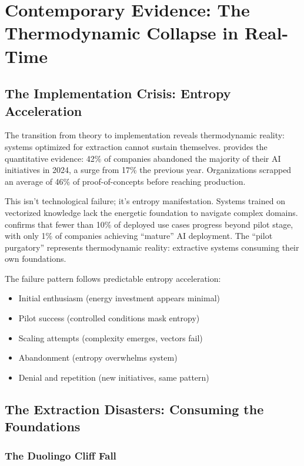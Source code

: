 \section{Contemporary Evidence: The Thermodynamic Collapse in Real-Time}

\subsection{The Implementation Crisis: Entropy Acceleration}

The transition from theory to implementation reveals thermodynamic reality: systems optimized for extraction cannot sustain themselves. \citet{spglobal2025} provides the quantitative evidence: 42\% of companies abandoned the majority of their AI initiatives in 2024, a surge from 17\% the previous year. Organizations scrapped an average of 46\% of proof-of-concepts before reaching production.

This isn't technological failure; it's entropy manifestation. Systems trained on vectorized knowledge lack the energetic foundation to navigate complex domains. \citet{mckinsey2025} confirms that fewer than 10\% of deployed use cases progress beyond pilot stage, with only 1\% of companies achieving ``mature'' AI deployment. The ``pilot purgatory'' represents thermodynamic reality: extractive systems consuming their own foundations.

The failure pattern follows predictable entropy acceleration:
\begin{itemize}
\item Initial enthusiasm (energy investment appears minimal)
\item Pilot success (controlled conditions mask entropy)
\item Scaling attempts (complexity emerges, vectors fail)
\item Abandonment (entropy overwhelms system)
\item Denial and repetition (new initiatives, same pattern)
\end{itemize}

\subsection{The Extraction Disasters: Consuming the Foundations}

\subsubsection{The Duolingo Cliff Fall}

